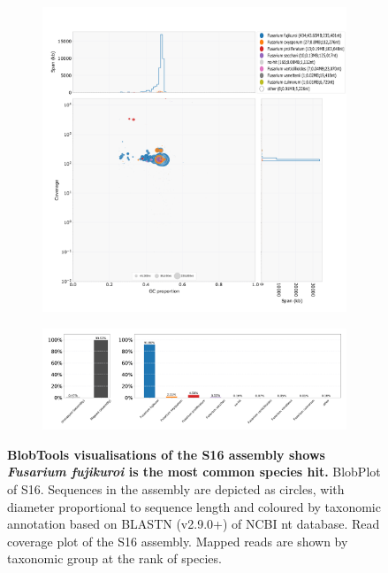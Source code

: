 \captionsetup{subrefformat=parens}

\begin{figure}[hp!]
    \centering
    \begin{subfigure}[]{0.9\textwidth}
        \centering
        \includegraphics[width=\textwidth]{Figures/TNAU_S16.species.blobplot.pdf}
        \caption{}
        \label{fig:BlobPlot-S16}
    \end{subfigure}
    \begin{subfigure}[]{0.9\textwidth}
        \centering
        \includegraphics[width=\textwidth]{Figures/TNAU_S16.blobtools.blobDB.json.bestsum.species.p8.span.100.blobplot.read_cov.bam0.pdf}
        \caption{}
        \label{fig:BlobPlot_readcov-S16}
    \end{subfigure}
    \caption[BlobTools visualisations of the S16 assembly]{\textbf{BlobTools visualisations of the S16 assembly shows \textit{Fusarium fujikuroi} is the most common species hit.}
         BlobPlot of S16. Sequences in the assembly are depicted as circles, with diameter proportional to sequence length and coloured by taxonomic annotation based on BLASTN (v2.9.0+) of NCBI nt database.
         Read coverage plot of the S16 assembly. Mapped reads are shown by taxonomic group at the rank of species.}
\end{figure}
\bigskip


